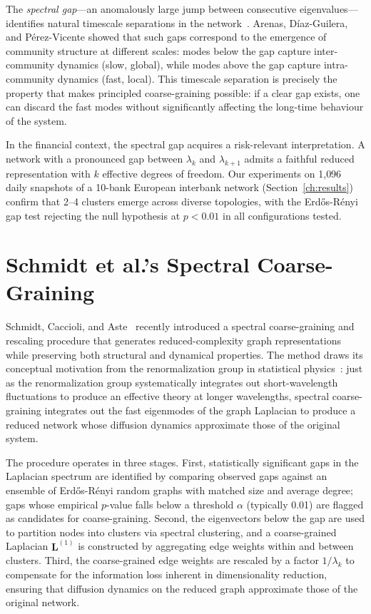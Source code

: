 The \emph{spectral gap}---an anomalously large jump between consecutive
eigenvalues---identifies natural timescale separations in the
network~\cite{arenas2006synchronization}.  Arenas, D\'iaz-Guilera, and
P\'erez-Vicente showed that such gaps correspond to the emergence of
community structure at different scales: modes below the gap capture
inter-community dynamics (slow, global), while modes above the gap
capture intra-community dynamics (fast, local).  This timescale
separation is precisely the property that makes principled
coarse-graining possible: if a clear gap exists, one can discard the
fast modes without significantly affecting the long-time behaviour of the
system.

In the financial context, the spectral gap acquires a risk-relevant
interpretation.  A network with a pronounced gap between $\lambda_k$ and
$\lambda_{k+1}$ admits a faithful reduced representation with $k$
effective degrees of freedom.  Our experiments on 1{,}096 daily snapshots
of a 10-bank European interbank network (Section~\ref{ch:results})
confirm that 2--4 clusters emerge across diverse topologies, with the
Erd\H{o}s-R\'enyi gap test rejecting the null hypothesis at $p < 0.01$
in all configurations tested.

\section{Schmidt et al.'s Spectral Coarse-Graining}
\label{sec:intro_scg}

Schmidt, Caccioli, and Aste~\cite{schmidt2024spectral} recently introduced
a spectral coarse-graining and rescaling procedure that generates
reduced-complexity graph representations while preserving both structural
and dynamical properties.  The method draws its conceptual motivation from
the renormalization group in statistical
physics~\cite{wilson1975renormalization}: just as the renormalization group
systematically integrates out short-wavelength fluctuations to produce an
effective theory at longer wavelengths, spectral coarse-graining integrates
out the fast eigenmodes of the graph Laplacian to produce a reduced
network whose diffusion dynamics approximate those of the original system.

The procedure operates in three stages.  First, statistically significant
gaps in the Laplacian spectrum are identified by comparing observed gaps
against an ensemble of Erd\H{o}s-R\'enyi random graphs with matched size
and average degree; gaps whose empirical $p$-value falls below a
threshold $\alpha$ (typically 0.01) are flagged as candidates for
coarse-graining.  Second, the eigenvectors below the gap are used to
partition nodes into clusters via spectral clustering, and a
coarse-grained Laplacian $\mathbf{L}^{(1)}$ is constructed by aggregating
edge weights within and between clusters.  Third, the coarse-grained edge
weights are rescaled by a factor $1/\lambda_k$ to compensate for the
information loss inherent in dimensionality reduction, ensuring that
diffusion dynamics on the reduced graph approximate those of the original
network.

